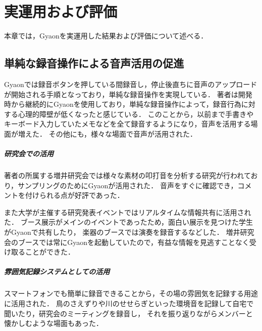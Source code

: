 \chapter{実運用および評価}
\label{chap:evaluation}

本章では，Gyaonを実運用した結果および評価について述べる．

\newpage

\section{単純な録音操作による音声活用の促進}
Gyaonでは録音ボタンを押している間録音し，停止後直ちに音声のアップロードが開始される手順となっており，単純な録音操作を実現している．
著者は開発時から継続的にGyaonを使用しており，単純な録音操作によって，録音行為に対する心理的障壁が低くなったと感じている．
このことから，以前まで手書きやキーボード入力していたメモなどを全て録音するようになり，音声を活用する場面が増えた．
その他にも，様々な場面で音声が活用された．

\paragraph*{研究会での活用}
著者の所属する増井研究会では様々な素材の叩打音を分析する研究が行われており，サンプリングのためにGyaonが活用された．
音声をすぐに確認でき，コメントを付けられる点が好評であった．

また大学が主催する研究発表イベントではリアルタイムな情報共有に活用された．
ブース展示がメインのイベントであったため，面白い展示を見つけた学生がGyaonで共有したり，
楽器のブースでは演奏を録音するなどした．
増井研究会のブースでは常にGyaonを起動していたので，有益な情報を見逃すことなく受け取ることができた．

%


\paragraph*{雰囲気記録システムとしての活用}
スマートフォンでも簡単に録音できることから，その場の雰囲気を記録する用途に活用された．
鳥のさえずりや川のせせらぎといった環境音を記録して自宅で聞いたり，研究会のミーティングを録音し，
それを振り返りながらメンバーと懐かしむような場面もあった．

